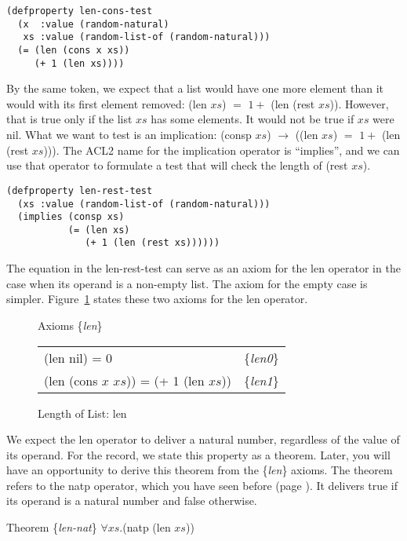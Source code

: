 \begin{Verbatim}
(defproperty len-cons-test
  (x  :value (random-natural)
   xs :value (random-list-of (random-natural)))
  (= (len (cons x xs))
     (+ 1 (len xs))))
\end{Verbatim}

By the same token, we expect that a list would
have one more element than it would with
its first element removed: (len $xs$) $=$ $1 +$ (len (rest $xs$)).
However, that is true only if the list $xs$
has some elements. It would not be true if $xs$ were nil.
What we want to test is an implication:
(consp $xs$) $\rightarrow$ ((len $xs$) $=$ $1 +$ (len (rest $xs$))).
The ACL2 name for the implication operator is ``implies'',
and we can use that operator to formulate a test that
will check the length of (rest $xs$).

\begin{Verbatim}
(defproperty len-rest-test
  (xs :value (random-list-of (random-natural)))
  (implies (consp xs)
           (= (len xs)
              (+ 1 (len (rest xs))))))
\end{Verbatim}

The equation in the len-rest-test can serve
as an axiom for the len operator in the case
when its operand is a non-empty list.
The axiom for the empty case is simpler.
Figure~\ref{fig:len-axioms} states these two axioms for
the len operator.

\begin{figure}
\begin{center}
Axioms \{\emph{len}\} \\
\begin{tabular}{ll}
(len nil) = 0                            & \{\emph{len0}\} \\
(len (cons $x$ $xs$)) = (+ 1 (len $xs$)) & \{\emph{len1}\}
\end{tabular}
\end{center}
\caption{Length of List: len}
\label{len-equations}
\label{fig:len-axioms}
\end{figure}

We expect the len operator to deliver a natural number,
regardless of the value of its operand.
For the record, we state this property as a theorem.
Later, you will have an opportunity to derive
this theorem from the \{\emph{len}\} axioms.
The theorem refers to the natp operator,
which you have seen before (page \pageref{natp-op}).
It delivers true if its operand is a natural number and false otherwise.
\begin{samepage}
\label{len-nat-thm}
\begin{center}
Theorem \{\emph{len-nat}\} $\forall xs.$(natp (len $xs$))
\end{center}
\end{samepage}

